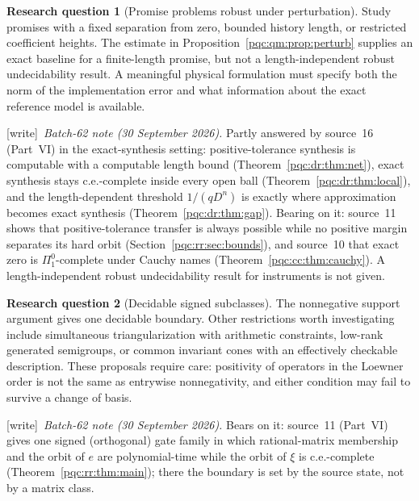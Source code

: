 \documentclass[11pt,letterpaper]{article}
\numberwithin{equation}{section}
\theoremstyle{definition}
\newtheorem{question}{Research question}
\theoremstyle{remark}
\newcommand{\wtag}{\textup{[write]}}
\newcommand{\pione}{\Pi^0_1}
\begin{document}
\begin{question}[Promise problems robust under perturbation]\label{pqc:q:promise}
Study promises with a fixed separation from zero, bounded history length, or restricted coefficient heights. The estimate in Proposition~\ref{pqc:qm:prop:perturb} supplies an exact baseline for a finite-length promise, but not a length-independent robust undecidability result. A meaningful physical formulation must specify both the norm of the implementation error and what information about the exact reference model is available.
\par\noindent\wtag\ \emph{Batch-62 note (30 September 2026).} Partly answered by source~16 (Part~VI) in the exact-synthesis setting:
positive-tolerance synthesis is computable with a computable length bound
(Theorem~\ref{pqc:dr:thm:net}), exact synthesis stays c.e.-complete inside
every open ball (Theorem~\ref{pqc:dr:thm:local}), and the length-dependent
threshold $1/(qD^n)$ is exactly where approximation becomes exact synthesis
(Theorem~\ref{pqc:dr:thm:gap}). Bearing on it: source~11 shows that
positive-tolerance transfer is always possible while no positive margin
separates its hard orbit (Section~\ref{pqc:rr:sec:bounds}), and source~10 that
exact zero is $\pione$-complete under Cauchy names
(Theorem~\ref{pqc:cc:thm:cauchy}). A length-independent robust undecidability
result for instruments is not given.
\end{question}

\begin{question}[Decidable signed subclasses]\label{pqc:q:signed}
The nonnegative support argument gives one decidable boundary. Other restrictions worth investigating include simultaneous triangularization with arithmetic constraints, low-rank generated semigroups, or common invariant cones with an effectively checkable description. These proposals require care: positivity of operators in the Loewner order is not the same as entrywise nonnegativity, and either condition may fail to survive a change of basis.
\par\noindent\wtag\ \emph{Batch-62 note (30 September 2026).} Bears on it: source~11 (Part~VI) gives one signed (orthogonal) gate family
in which rational-matrix membership and the orbit of $e$ are polynomial-time
while the orbit of $\xi$ is c.e.-complete
(Theorem~\ref{pqc:rr:thm:main}); there the boundary is set by the source state,
not by a matrix class.
\end{question}
\end{document}
